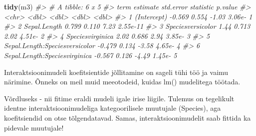 \documentclass[]{book}
\newenvironment{Shaded}{\begin{snugshade}}{\end{snugshade}}
\newcommand{\CommentTok}[1]{\textcolor[rgb]{0.56,0.35,0.01}{\textit{#1}}}
\newcommand{\DataTypeTok}[1]{\textcolor[rgb]{0.13,0.29,0.53}{#1}}
\newcommand{\KeywordTok}[1]{\textcolor[rgb]{0.13,0.29,0.53}{\textbf{#1}}}
\newcommand{\NormalTok}[1]{#1}
\newcommand{\OperatorTok}[1]{\textcolor[rgb]{0.81,0.36,0.00}{\textbf{#1}}}
\newcommand{\StringTok}[1]{\textcolor[rgb]{0.31,0.60,0.02}{#1}}
\begin{document}
\begin{Shaded}
\begin{Highlighting}[]
\KeywordTok{tidy}\NormalTok{(m3)}
\CommentTok{#> # A tibble: 6 x 5}
\CommentTok{#>   term                           estimate std.error statistic  p.value}
\CommentTok{#>   <chr>                             <dbl>     <dbl>     <dbl>    <dbl>}
\CommentTok{#> 1 (Intercept)                      -0.569     0.554     -1.03 3.06e- 1}
\CommentTok{#> 2 Sepal.Length                      0.799     0.110      7.23 2.55e-11}
\CommentTok{#> 3 Speciesversicolor                 1.44      0.713      2.02 4.51e- 2}
\CommentTok{#> 4 Speciesvirginica                  2.02      0.686      2.94 3.85e- 3}
\CommentTok{#> 5 Sepal.Length:Speciesversicolor   -0.479     0.134     -3.58 4.65e- 4}
\CommentTok{#> 6 Sepal.Length:Speciesvirginica    -0.567     0.126     -4.49 1.45e- 5}
\end{Highlighting}
\end{Shaded}

Interaktsioonimudeli koefitsientide jõllitamine on sageli tühi töö ja vaimu närimine. Õnneks on meil muid meeotodeid, kuidas lm() mudelitega töötada.

Võrdluseks - nii fitime eraldi mudeli igale irise liigile. Tulemus on tegelikult identne interaktsioonimudeliga kategoorilisele muutujale (Species), aga koefitsiendid on otse tõlgendatavad. Samas, interaktsioonimudelit saab fittida ka pidevale muutujale!

\begin{Shaded}
\end{Shaded}
\end{document}
